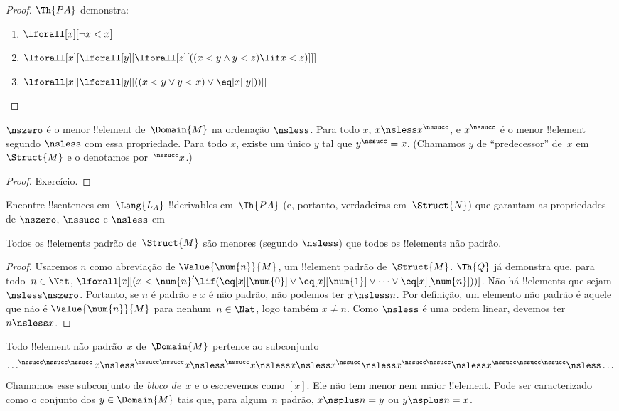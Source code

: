 \documentclass[../../../include/open-logic-section]{subfiles}
\begin{document}
\begin{proof}
$\Th{PA}$ demonstra:
\begin{enumerate}
\item $\lforall[x][\lnot x < x]$
\item $\lforall[x][\lforall[y][\lforall[z][((x < y \land y < z) \lif x < z)]]]$
\item $\lforall[x][\lforall[y][((x < y \lor y < x) \lor \eq[x][y]))]]$
\end{enumerate}
\end{proof}

\begin{prop}
 $\nszero$ é o menor !!{element}
de~$\Domain{M}$ na ordenação $\nsless$. Para todo $x$, $x \nsless
x^\nssucc$, e $x^\nssucc$ é o menor !!{element} segundo $\nsless$ com
essa propriedade. Para todo $x$, existe um único $y$ tal que
$y^\nssucc = x$. (Chamamos $y$ de ``predecessor'' de~$x$ em
$\Struct{M}$ e o denotamos por~$^\nssucc x$.)
\end{prop}

\begin{proof}
Exercício.  
\end{proof}

\begin{prob}
Encontre !!{sentence}s em~$\Lang{L_A}$ !!{derivable}s em~$\Th{PA}$ (e,
portanto, verdadeiras em~$\Struct{N}$) que garantam as propriedades de
$\nszero$, $\nssucc$ e $\nsless$ em
\end{prob}

\begin{prop}
Todos os !!{element}s padrão de~$\Struct{M}$ são menores (segundo
$\nsless$) que todos os !!{element}s não padrão.
\end{prop}

\begin{proof}
Usaremos $n$ como abreviação de $\Value{\num{n}}{M}$, um
!!{element} padrão de~$\Struct{M}$. $\Th{Q}$ já demonstra que, para
todo~$n \in \Nat$, $\lforall[x][(x < \num{n}' \lif
(\eq[x][\num{0}] \lor \eq[x][\num{1}] \lor \dots \lor
\eq[x][\num{n}]))]$. Não há !!{element}s que sejam $\nsless
\nszero$. Portanto, se $n$ é padrão e $x$ é não padrão, não podemos
ter $x \nsless n$. Por definição, um elemento não padrão é aquele que
não é $\Value{\num{n}}{M}$ para nenhum~$n \in \Nat$, logo também
$x \neq n$. Como $\nsless$ é uma ordem linear, devemos ter
$n \nsless x$.
\end{proof}

\begin{prop}
Todo !!{element} não padrão~$x$ de~$\Domain{M}$ pertence ao subconjunto
\[
\dots ^{\nssucc\nssucc\nssucc}x \nsless ^{\nssucc\nssucc}x \nsless
^{\nssucc}x \nsless x \nsless x^{\nssucc} \nsless x^{\nssucc\nssucc}
\nsless x^{\nssucc\nssucc\nssucc} \nsless \dots
\]
Chamamos esse subconjunto de \emph{bloco de~$x$} e o escrevemos como
$[x]$. Ele não tem menor nem maior !!{element}. Pode ser caracterizado
como o conjunto dos $y \in \Domain{M}$ tais que, para algum~$n$ padrão,
$x \nsplus n = y$ ou $y \nsplus n = x$.
\end{prop}
\end{document}
